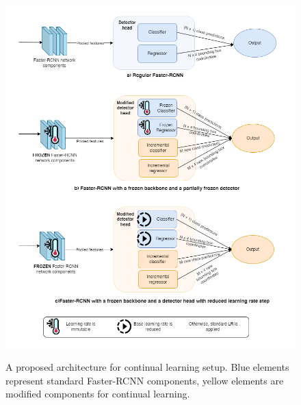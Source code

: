 \begin{figure}[htb]
	\begin{center}
		\includegraphics[width=16cm]{./FC.png}
	\end{center}
	\caption{A proposed architecture for continual learning setup. Blue elements represent standard Faster-RCNN components, yellow elements are modified components for continual learning.}
	\begin{center}
		\label{continualModel}
	\end{center}
\end{figure}
\FloatBarrier


\clearpage